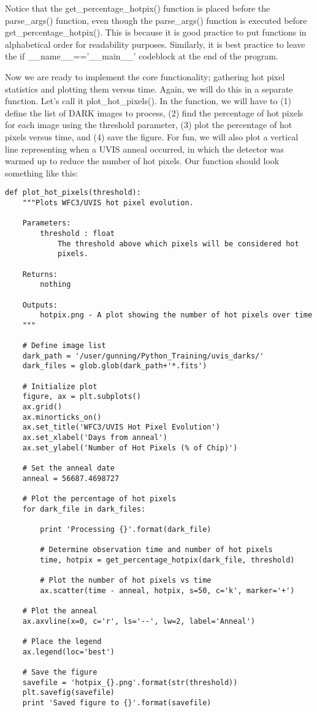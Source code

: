 Notice that the {\sf\small get\_percentage\_hotpix()} function is placed before the {\sf\small parse\_args()}
function, even though the {\sf\small parse\_args()} function is executed before {\sf\small get\_percentage\_hotpix()}.
This is because it is good practice to put functions in alphabetical order for readability
purposes.  Similarly, it is best practice to leave the {\sf\small if \_\_name\_\_=='\_\_main\_\_'} codeblock
at the end of the program.

Now we are ready to implement the core functionality; gathering hot pixel statistics and
plotting them versus time.  Again, we will do this in a separate function.  Let's call it {\sf\small plot\_hot\_pixels()}.
In the function, we will have to (1) define the list of DARK images to process, (2) find the percentage
of hot pixels for each image using the threshold parameter, (3) plot the percentage of hot 
pixels versus time, and (4) save the figure.  For fun, we will also plot a vertical line 
representing when a UVIS anneal occurred, in which the detector was warmed up to reduce the 
number of hot pixels.  Our function should look something like this:

\begin{verbatim}
def plot_hot_pixels(threshold):
    """Plots WFC3/UVIS hot pixel evolution.

    Parameters:
        threshold : float
            The threshold above which pixels will be considered hot
            pixels.

    Returns:
        nothing

    Outputs:
        hotpix.png - A plot showing the number of hot pixels over time
    """

    # Define image list
    dark_path = '/user/gunning/Python_Training/uvis_darks/'
    dark_files = glob.glob(dark_path+'*.fits')

    # Initialize plot
    figure, ax = plt.subplots()
    ax.grid()
    ax.minorticks_on()
    ax.set_title('WFC3/UVIS Hot Pixel Evolution')
    ax.set_xlabel('Days from anneal')
    ax.set_ylabel('Number of Hot Pixels (% of Chip)')

    # Set the anneal date
    anneal = 56687.4698727

    # Plot the percentage of hot pixels
    for dark_file in dark_files:

        print 'Processing {}'.format(dark_file)

        # Determine observation time and number of hot pixels
        time, hotpix = get_percentage_hotpix(dark_file, threshold)

        # Plot the number of hot pixels vs time
        ax.scatter(time - anneal, hotpix, s=50, c='k', marker='+')

    # Plot the anneal
    ax.axvline(x=0, c='r', ls='--', lw=2, label='Anneal')

    # Place the legend
    ax.legend(loc='best')

    # Save the figure
    savefile = 'hotpix_{}.png'.format(str(threshold))
    plt.savefig(savefile)
    print 'Saved figure to {}'.format(savefile)
\end{verbatim}

